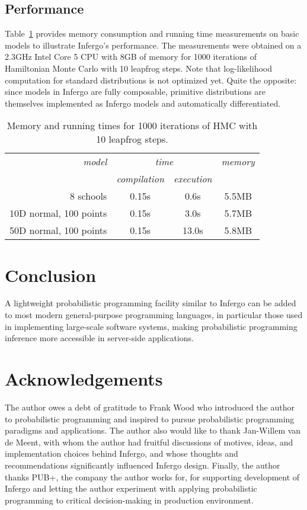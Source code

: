 \documentclass[sigplan,review,10pt,anonymous]{acmart}
\begin{document}
\begin{sloppypar}
\subsection{Performance}

Table~\ref{tab:memory-runtime} provides memory consumption and
running time measurements on basic models to illustrate
Infergo's performance.  The measurements were obtained on a
2.3GHz Intel Core 5 CPU with 8GB of memory for 1000 iterations
of Hamiltonian Monte Carlo with 10 leapfrog steps. Note that
log-likelihood computation for standard distributions is not
optimized yet. Quite the opposite: since models in Infergo are
fully composable, primitive distributions are themselves
implemented as Infergo models and automatically differentiated.

{\smaller
\begin{table}[H]
\caption{Memory and running times for 1000 iterations
of HMC with 10 leapfrog steps.}
\label{tab:memory-runtime}
\begin{tabular}{r | c |  c | c}
	{\it model}  & \multicolumn{2}{c|}{\it time} & {\it memory} \\ 
	 & {\it compilation} & {\it execution} & \\\hline
	8 schools & 0.15s & 0.6s & 5.5MB \\
	10D normal, 100 points & 0.15s & 3.0s & 5.7MB \\
	50D normal, 100 points & 0.15s & 13.0s & 5.8MB 
\end{tabular}
\end{table}}

\section{Conclusion}

A lightweight probabilistic programming facility similar to
Infergo can be added to most modern general-purpose programming
languages, in particular those used in implementing large-scale
software systems, making probabilistic programming inference
more accessible in server-side applications.

\section*{Acknowledgements}

The author owes a debt of gratitude to Frank Wood who introduced
the author to probabilistic programming and inspired to
pursue probabilistic programming paradigms and applications. The
author also would like to thank Jan-Willem van de Meent, with
whom the author had fruitful discussions of motives, ideas, and
implementation choices behind Infergo, and whose thoughts and
recommendations significantly influenced Infergo design.
Finally, the author thanks PUB+, the company the author works
for, for supporting development of Infergo and letting the
author experiment with applying probabilistic programming to
critical decision-making in production environment.

\end{sloppypar}


\end{document}
